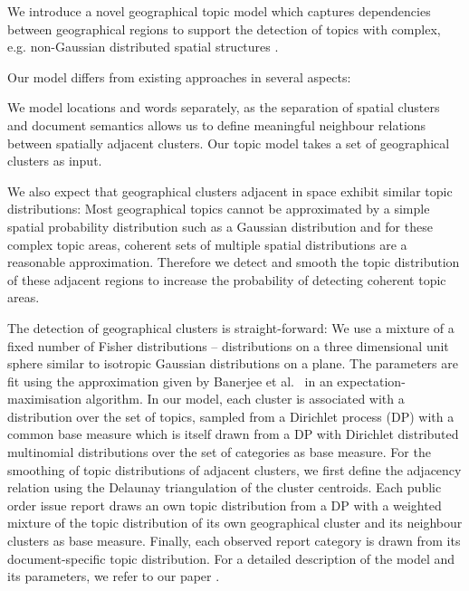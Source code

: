 \documentclass[external]{20120615_deliverable_template_ukob}
\theoremstyle{definition}
\begin{document}
We introduce a novel geographical topic model which captures dependencies
between geographical regions to support the detection of topics with complex,
e.g. non-Gaus\-sian distributed spatial structures \cite{CCK1}.

Our model differs from existing approaches in several aspects:

We model locations and words separately, as the separation of spatial clusters
and document semantics allows us to define meaningful neighbour relations
between spatially adjacent clusters. Our topic model takes a set of geographical
clusters as input.

We also expect that geographical clusters adjacent in space exhibit similar
topic distributions: Most geographical topics cannot be approximated by a simple
spatial probability distribution such as a Gaussian distribution and for these
complex topic areas, coherent sets of multiple spatial distributions are a
reasonable approximation.  Therefore we detect and smooth the topic distribution
of these adjacent regions to increase the probability of detecting coherent
topic areas.

The detection of geographical clusters is straight-forward: We use a mixture of
a fixed number of Fisher distributions -- distributions on a three dimensional
unit sphere similar to isotropic Gaussian distributions on a plane. The
parameters are fit using the approximation given by Banerjee et
al.~\cite{DBLP:journals/jmlr/BanerjeeDGS05} in an expectation-maximisation
algorithm.  In our model, each cluster is associated with a distribution over
the set of topics, sampled from a Dirichlet process (DP) with a common base
measure which is itself drawn from a DP with Dirichlet distributed multinomial
distributions over the set of categories as base measure.  For the smoothing of
topic distributions of adjacent clusters, we first define the adjacency relation
using the Delaunay triangulation \cite{journals/csur/Aurenhammer91} of the
cluster centroids.  Each public order issue report draws an own topic
distribution from a DP with a weighted mixture of the topic distribution of its
own geographical cluster and its neighbour clusters as base measure.  Finally,
each observed report category is drawn from its document-specific topic
distribution.  For a detailed description of the model and its parameters, we
refer to our paper \cite{CCK1}.
\end{document}
